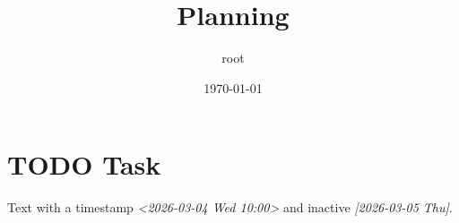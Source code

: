 \documentclass[11pt]{article}
\author{root}
\date{\today}
\title{Planning}
\begin{document}
\maketitle
\tableofcontents

\section{{\bfseries\sffamily TODO} Task}
\label{sec:org4fdb5f9}
Text with a timestamp \textit{<2026-03-04 Wed 10:00> } and inactive \textit{[2026-03-05 Thu]}.
\end{document}
